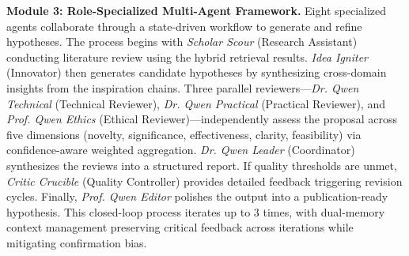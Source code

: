 \documentclass[runningheads]{llncs}
\begin{document}
\textbf{Module 3: Role-Specialized Multi-Agent Framework.} Eight specialized agents collaborate through a state-driven workflow to generate and refine hypotheses. The process begins with \textit{Scholar Scour} (Research Assistant) conducting literature review using the hybrid retrieval results. \textit{Idea Igniter} (Innovator) then generates candidate hypotheses by synthesizing cross-domain insights from the inspiration chains. Three parallel reviewers---\textit{Dr. Qwen Technical} (Technical Reviewer), \textit{Dr. Qwen Practical} (Practical Reviewer), and \textit{Prof. Qwen Ethics} (Ethical Reviewer)---independently assess the proposal across five dimensions (novelty, significance, effectiveness, clarity, feasibility) via confidence-aware weighted aggregation. \textit{Dr. Qwen Leader} (Coordinator) synthesizes the reviews into a structured report. If quality thresholds are unmet, \textit{Critic Crucible} (Quality Controller) provides detailed feedback triggering revision cycles. Finally, \textit{Prof. Qwen Editor} polishes the output into a publication-ready hypothesis. This closed-loop process iterates up to 3 times, with dual-memory context management preserving critical feedback across iterations while mitigating confirmation bias.

\end{document}
